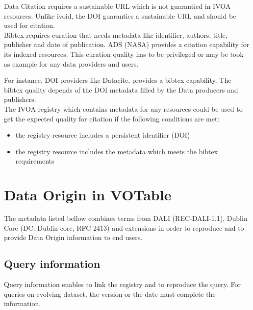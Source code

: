 \documentclass[11pt,a4paper]{ivoa}
\begin{document}
Data Citation requires a sustainable URL which is not guarantied in IVOA resources. 
Unlike ivoid, the DOI guaranties a sustainable URL and should be used for citation. \\

Bibtex requires curation that needs metadata like identifier, authors, title, publisher and date of publication. 
ADS (NASA) provides a citation capability for its indexed resources. This curation quality has to be privileged or may be took as example for any data providers and users.

For instance, DOI providers like Datacite, provides a bibtex capability. The bibtex quality depends of the DOI metadata filled by the Data producers and publishers.\\

The IVOA registry which contains metadata for any resources could be used to get the expected quality for citation if the following conditions are met:
\begin{itemize}
\item the registry resource includes a persistent identifier (DOI)
\item the registry resource includes the metadata which meets the bibtex requirements
\end{itemize}




\section{Data Origin in VOTable}

The metadata listed bellow combines terms from DALI (REC-DALI-1.1), Dublin Core (DC: Dublin core, RFC 2413) and extensions in order to reproduce and to provide Data Origin information to end users.

\subsection{Query information}
Query information enables to link the registry and to reproduce the query. For queries on evolving dataset, the version or the date must complete the information.\\
\end{document}
